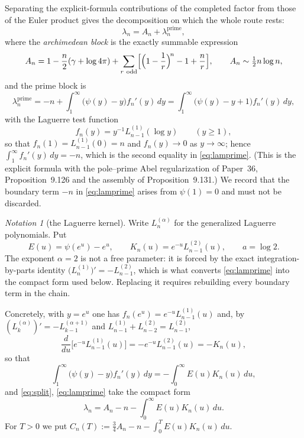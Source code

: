 \documentclass[11pt]{amsart}
\theoremstyle{definition}
\theoremstyle{remark}
\newtheorem{notation}[theorem]{Notation}
\theoremstyle{definition}
\newcommand{\gam}{\gamma}
\begin{document}
Separating the explicit-formula contributions of the completed factor from those of the Euler
product gives the decomposition on which the whole route rests:
\begin{equation}\label{eq:split}
   \lambda_n=A_n+\lambda_n^{\mathrm{prime}} ,
\end{equation}
where the \emph{archimedean block} is the exactly summable expression
\begin{equation}\label{eq:An}
   A_n=1-\frac n2(\gam+\log4\pi)
   +\sum_{r\ \mathrm{odd}}\Bigl[\Bigl(1-\frac1r\Bigr)^{\!n}-1+\frac nr\Bigr],
   \qquad A_n\sim\tfrac12 n\log n,
\end{equation}
and the prime block is
\begin{equation}\label{eq:lamprime}
   \lambda_n^{\mathrm{prime}}
   =-n+\int_1^\infty\bigl(\psi(y)-y\bigr)f_n'(y)\,dy
   =\int_1^\infty\bigl(\psi(y)-y+1\bigr)f_n'(y)\,dy ,
\end{equation}
with the Laguerre test function
\[
   f_n(y)=y^{-1}L^{(1)}_{n-1}(\log y)\qquad(y\ge1),
\]
so that $f_n(1)=L^{(1)}_{n-1}(0)=n$ and $f_n(y)\to0$ as $y\to\infty$; hence
$\int_1^\infty f_n'(y)\,dy=-n$, which is the second equality in \eqref{eq:lamprime}. (This is the
explicit formula with the pole--prime Abel regularization of Paper~36, Proposition~9.126 and the
assembly of Proposition~9.131.) We record that the
boundary term $-n$ in \eqref{eq:lamprime} arises from $\psi(1)=0$ and must not be discarded.

\begin{notation}[the Laguerre kernel]\label{not:kernel}
Write $L_n^{(\alpha)}$ for the generalized Laguerre polynomials. Put
\[
   E(u)=\psi(e^u)-e^u,\qquad K_n(u)=e^{-u}L^{(2)}_{n-1}(u),\qquad a=\log2 .
\]
The exponent $\alpha=2$ is not a free parameter: it is forced by the exact integration-by-parts
identity $\bigl(L_n^{(1)}\bigr)'=-L^{(2)}_{n-1}$, which is what converts \eqref{eq:lamprime}
into the compact form used below. Replacing it requires rebuilding every boundary term in the
chain.
\end{notation}

Concretely, with $y=e^u$ one has $f_n(e^u)=e^{-u}L^{(1)}_{n-1}(u)$ and, by
$(L^{(\alpha)}_k)'=-L^{(\alpha+1)}_{k-1}$ and $L^{(1)}_{n-1}+L^{(2)}_{n-2}=L^{(2)}_{n-1}$,
\[
   \frac{d}{du}\bigl[e^{-u}L^{(1)}_{n-1}(u)\bigr]=-e^{-u}L^{(2)}_{n-1}(u)=-K_n(u),
\]
so that
\[
   \int_1^\infty\bigl(\psi(y)-y\bigr)f_n'(y)\,dy=-\int_0^\infty E(u)K_n(u)\,du ,
\]
and \eqref{eq:split}, \eqref{eq:lamprime} take the compact form
\[
   \lambda_n=A_n-n-\int_0^\infty E(u)K_n(u)\,du .
\]
For $T>0$ we put $C_n(T):=\tfrac34A_n-n-\int_0^TE(u)K_n(u)\,du$.
\end{document}
